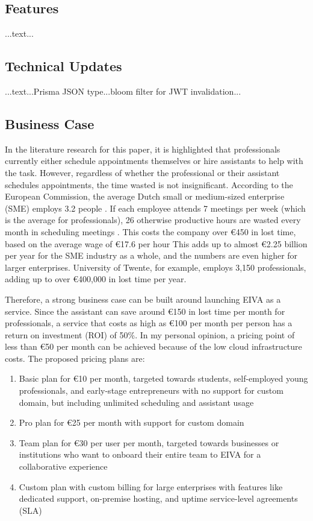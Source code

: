 \documentclass{article}
\begin{document}
\subsection{Features}

...text...

\subsection{Technical Updates}

...text...Prisma JSON type...bloom filter for JWT invalidation...

\subsection{Business Case}

In the literature research for this paper, it is highlighted that professionals currently either schedule appointments themselves or hire assistants to help with the task. However, regardless of whether the professional or their assistant schedules appointments, the time wasted is not insignificant. According to the European Commission, the average Dutch small or medium-sized enterprise (SME) employs 3.2 people \cite{noauthor_2019_2019}. If each employee attends 7 meetings per week (which is the average for professionals), 26 otherwise productive hours are wasted every month in scheduling meetings \cite{kincaid_electronic_1985}. This costs the company over €450 in lost time, based on the average wage of €17.6 per hour \cite{wedia_salary_nodate} This adds up to almost €2.25 billion per year for the SME industry as a whole, and the numbers are even higher for larger enterprises. University of Twente, for example, employs 3,150 professionals, adding up to over €400,000 in lost time per year.

Therefore, a strong business case can be built around launching EIVA as a service. Since the assistant can save around €150 in lost time per month for professionals, a service that costs as high as €100 per month per person has a return on investment (ROI) of 50\%. In my personal opinion, a pricing point of less than €50 per month can be achieved because of the low cloud infrastructure costs. The proposed pricing plans are:

\begin{enumerate}
	\item Basic plan for €10 per month, targeted towards students, self-employed young professionals, and early-stage entrepreneurs with no support for custom domain, but including unlimited scheduling and assistant usage
	\item Pro plan for €25 per month with support for custom domain
	\item Team plan for €30 per user per month, targeted towards businesses or institutions who want to onboard their entire team to EIVA for a collaborative experience
	\item Custom plan with custom billing for large enterprises with features like dedicated support, on-premise hosting, and uptime service-level agreements (SLA)
\end{enumerate}
\end{document}
